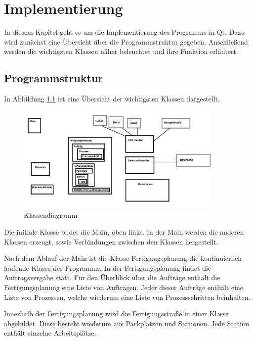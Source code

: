 
\chapter{Implementierung}
\label{sec:Implementierung}

In diesem Kapitel geht es um die Implementierung des Programms in Qt. Dazu wird zunächst eine Übersicht über die Programmstruktur gegeben. Anschließend werden die wichtigsten Klassen näher beleuchtet und ihre Funktion erläutert. 

\section{Programmstruktur}

In Abbildung \ref{fig:Klassendiagramm} ist eine Übersicht der wichtigsten Klassen dargestellt. 

\begin{figure}[htb]
    \centering
    \includegraphics[width=0.9\textwidth]{Abbildungen/Klassendiagramm.PNG}
    \caption{Klassendiagramm}		
    \label{fig:Klassendiagramm}
\end{figure}

Die initiale Klasse bildet die Main, oben links. In der Main werden die anderen Klassen erzeugt, sowie Verbindungen zwischen den Klassen hergestellt.

Nach dem Ablauf der Main ist die Klasse Fertigungsplanung die kontinuierlich laufende Klasse des Programms. In der Fertigungsplanung findet die Auftragsvergabe statt. Für den Überblick über die Aufträge enthält die Fertigungsplanung eine Liste von Aufträgen. Jeder dieser Aufträge enthält eine Liste von Prozessen, welche wiederum eine Liste von Prozessschritten beinhalten. 

Innerhalb der Fertigungsplanung wird die Fertigungsstraße in einer Klasse abgebildet. Diese besteht wiederum aus Parkplätzen und Stationen. Jede Station enthält einzelne Arbeitsplätze. 

